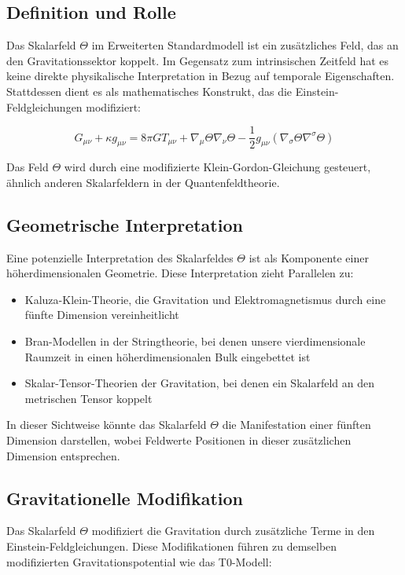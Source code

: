 \documentclass[12pt,a4paper]{article}
\begin{document}
	\subsection{Definition und Rolle}
	\label{subsec:scalar_field_definition}
	
	Das Skalarfeld \(\Theta\) im Erweiterten Standardmodell ist ein zusätzliches Feld, das an den Gravitationssektor koppelt. Im Gegensatz zum intrinsischen Zeitfeld hat es keine direkte physikalische Interpretation in Bezug auf temporale Eigenschaften. Stattdessen dient es als mathematisches Konstrukt, das die Einstein-Feldgleichungen modifiziert:
	
	\begin{equation}
		G_{\mu\nu} + \kappa g_{\mu\nu} = 8\pi G T_{\mu\nu} + \nabla_{\mu}\Theta\nabla_{\nu}\Theta - \frac{1}{2}g_{\mu\nu}(\nabla_{\sigma}\Theta\nabla^{\sigma}\Theta)
	\end{equation}
	
	Das Feld \(\Theta\) wird durch eine modifizierte Klein-Gordon-Gleichung gesteuert, ähnlich anderen Skalarfeldern in der Quantenfeldtheorie.
	
	\subsection{Geometrische Interpretation}
	\label{subsec:geometrical_interpretation}
	
	Eine potenzielle Interpretation des Skalarfeldes \(\Theta\) ist als Komponente einer höherdimensionalen Geometrie. Diese Interpretation zieht Parallelen zu:
	
	\begin{itemize}
		\item Kaluza-Klein-Theorie, die Gravitation und Elektromagnetismus durch eine fünfte Dimension vereinheitlicht
		\item Bran-Modellen in der Stringtheorie, bei denen unsere vierdimensionale Raumzeit in einen höherdimensionalen Bulk eingebettet ist
		\item Skalar-Tensor-Theorien der Gravitation, bei denen ein Skalarfeld an den metrischen Tensor koppelt
	\end{itemize}
	
	In dieser Sichtweise könnte das Skalarfeld \(\Theta\) die Manifestation einer fünften Dimension darstellen, wobei Feldwerte Positionen in dieser zusätzlichen Dimension entsprechen.
	
	\subsection{Gravitationelle Modifikation}
	\label{subsec:gravitational_modification_esm}
	Das Skalarfeld \(\Theta\) modifiziert die Gravitation durch zusätzliche Terme in den Einstein-Feldgleichungen. Diese Modifikationen führen zu demselben modifizierten Gravitationspotential wie das T0-Modell:
	
\end{document}
